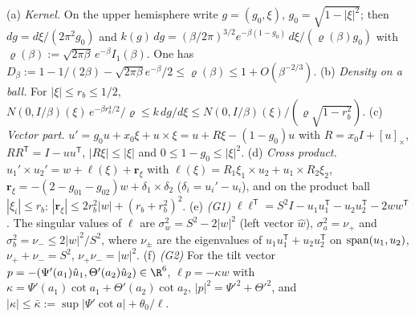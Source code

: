 \begin{lemma}\label{tu:L-exact}
(a) \emph{Kernel.} On the upper hemisphere write $g=(g_0,\xi)$, $g_0=\sqrt{1-|\xi|^2}$; then
$dg=d\xi/(2\pi^2g_0)$ and $k(g)\,dg=(\beta/2\pi)^{3/2}e^{-\beta(1-g_0)}\,d\xi/(\varrho(\beta)g_0)$ with
$\varrho(\beta):=\sqrt{2\pi\beta}\,e^{-\beta}I_1(\beta)$. One has
$D_\beta:=1-1/(2\beta)-\sqrt{2\pi\beta}e^{-\beta}/2\le\varrho(\beta)\le1+O(\beta^{-2/3})$.
(b) \emph{Density on a ball.} For $|\xi|\le r_b\le1/2$,
$N(0,I/\beta)(\xi)\,e^{-\beta r_b^4/2}/\varrho\le k\,dg/d\xi\le N(0,I/\beta)(\xi)/(\varrho\sqrt{1-r_b^2})$.
(c) \emph{Vector part.} $u'=g_0u+x_0\xi+u\times\xi=u+R\xi-(1-g_0)u$ with $R=x_0I+[u]_\times$,
$RR^{\mathsf T}=I-uu^{\mathsf T}$, $|R\xi|\le|\xi|$ and $0\le1-g_0\le|\xi|^2$.
(d) \emph{Cross product.} $u_1'\times u_2'=w+\ell(\xi)+\mathbf r_\xi$ with
$\ell(\xi)=R_1\xi_1\times u_2+u_1\times R_2\xi_2$,
$\mathbf r_\xi=-(2-g_{01}-g_{02})w+\delta_1\times\delta_2$ ($\delta_i=u_i'-u_i$), and on the product ball
$|\xi_i|\le r_b$: $|\mathbf r_\xi|\le2r_b^2|w|+(r_b+r_b^2)^2$.
(e) \emph{(G1)} $\ell\ell^{\mathsf T}=S^2I-u_1u_1^{\mathsf T}-u_2u_2^{\mathsf T}-2ww^{\mathsf T}$. The singular values
of $\ell$ are $\sigma_w^2=S^2-2|w|^2$ (left vector $\hat w$), $\sigma_a^2=\nu_+$ and $\sigma_b^2=\nu_-\le2|w|^2/S^2$,
where $\nu_\pm$ are the eigenvalues of $u_1u_1^{\mathsf T}+u_2u_2^{\mathsf T}$ on
${\rm span}(u_1,u_2)$, $\nu_++\nu_-=S^2$, $\nu_+\nu_-=|w|^2$.
(f) \emph{(G2)} For the tilt vector $p=-(\Psi'(a_1)\hat u_1,\Theta'(a_2)\hat u_2)\in\R^6$,
$\ell p=-\kappa w$ with $\kappa=\Psi'(a_1)\cot a_1+\Theta'(a_2)\cot a_2$, $|p|^2=\Psi'^2+\Theta'^2$,
and $|\kappa|\le\bar\kappa:=\sup|\Psi'\cot a|+\theta_0/\ell$.
\end{lemma}

